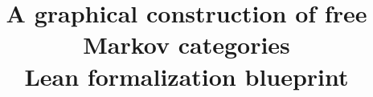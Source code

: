 \theoremstyle{definition}
\newtheorem{theorem}{Theorem}
\newtheorem{definition}[theorem]{Definition}
\newtheorem{lemma}[theorem]{Lemma}
\newtheorem{proposition}[theorem]{Proposition}
\newtheorem{corollary}[theorem]{Corollary}
\newtheorem{remark}[theorem]{Remark}
\newcommand{\moi}{I}
\title{A graphical construction of free Markov categories\\\large Lean formalization blueprint}
\author{}
\date{}

